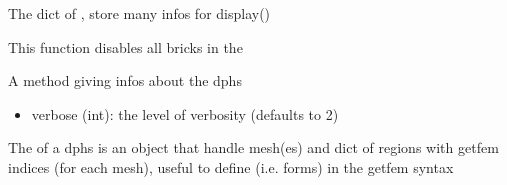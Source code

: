 \documentclass[letterpaper,10pt,english]{sphinxmanual}
\begin{document}
\begin{fulllineitems}
\begin{fulllineitems}
\label{\detokenize{scrimp:scrimp.dphs.DPHS.costates}}
\pysigstartsignatures
\pysigline
{}
\pysigstopsignatures
\sphinxAtStartPar
The dict of , store many infos for display()

\end{fulllineitems}


\begin{fulllineitems}
\label{\detokenize{scrimp:scrimp.dphs.DPHS.disable_all_bricks}}
\pysigstartsignatures
\pysiglinewithargsret
{}
{}
{}
\pysigstopsignatures
\sphinxAtStartPar
This function disables all bricks in the 

\end{fulllineitems}


\begin{fulllineitems}
\label{\detokenize{scrimp:scrimp.dphs.DPHS.display}}
\pysigstartsignatures
\pysiglinewithargsret
{}
{}
{}
\pysigstopsignatures
\sphinxAtStartPar
A method giving infos about the dphs
\begin{description}
\begin{itemize}
\item {} 
\sphinxAtStartPar
verbose (int): the level of verbosity (defaults to 2)

\end{itemize}

\end{description}

\end{fulllineitems}


\begin{fulllineitems}
\label{\detokenize{scrimp:scrimp.dphs.DPHS.domain}}
\pysigstartsignatures
\pysigline
{}
\pysigstopsignatures
\sphinxAtStartPar
The  of a dphs is an object that handle mesh(es) and dict of regions with getfem indices (for each mesh), useful to define  (i.e. forms) in the getfem syntax


\end{fulllineitems}
\end{fulllineitems}
\end{document}
